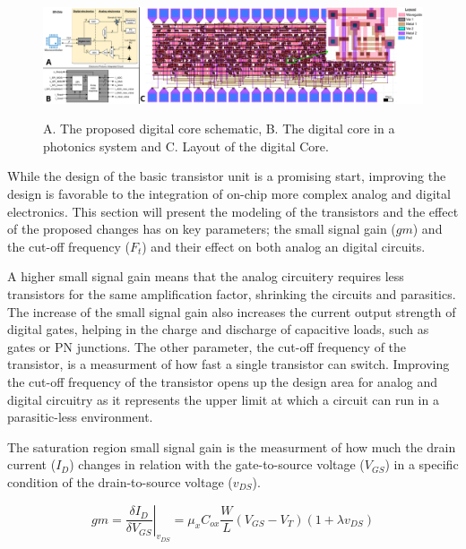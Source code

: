 \begin{figure}[t]
    \centering
    \includegraphics[width=\textwidth]{Core.png}
    \label{fig:Core}
    \caption{A. The proposed digital core schematic, B. The digital core in a photonics system and C. Layout of the digital Core.}
\end{figure}

While the design of the basic transistor unit is a promising start, improving the design is favorable to the integration of on-chip more complex analog and digital electronics.
This section will present the modeling of the transistors and the effect of the proposed changes has on key parameters; the small signal gain ($gm$) and the cut-off frequency ($F_t$) and their effect on both analog an digital circuits.

A higher small signal gain means that the analog circuitery requires less transistors for the same amplification factor, shrinking the circuits and parasitics. 
The increase of the small signal gain also increases the current output strength of digital gates, helping in the charge and discharge of capacitive loads, such as gates or PN junctions. 
The other parameter, the cut-off frequency of the transistor, is a measurment of how fast a single transistor can switch.
Improving the cut-off frequency of the transistor opens up the design area for analog and digital circuitry as it represents the upper limit at which a circuit can run in a parasitic-less environment.  

The saturation region small signal gain is the measurment of how much the drain current ($I_D$) changes in relation with the gate-to-source voltage ($V_{GS}$) in a specific condition of the drain-to-source voltage ($v_{DS}$).

\begin{equation}
\label{eq:gm}
gm = \left.\frac{\delta I_D}{\delta V_{GS}}\right|_{v_{DS}} = \mu_x C_{ox}\frac{W}{L}(V_{GS}-V_T)(1+\lambda v_{DS})
\end{equation}

